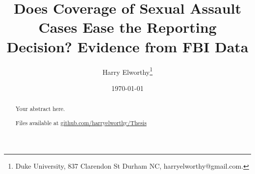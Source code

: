 \documentclass[AER,draftmode]{AEA}
\begin{document}
\title{Does Coverage of Sexual Assault Cases Ease the Reporting Decision? Evidence from FBI Data}
\author{Harry Elworthy\thanks{Duke University, 837 Clarendon St Durham NC, harryelworthy@gmail.com.}}
\date{\today}
\pubMonth{}
\pubYear{}
\pubVolume{}
\pubIssue{}
\JEL{}
\Keywords{}

\begin{abstract}
Your abstract here.

Files available at \url{github.com/harryelworthy/Thesis}
\end{abstract}


\maketitle










\end{document}
